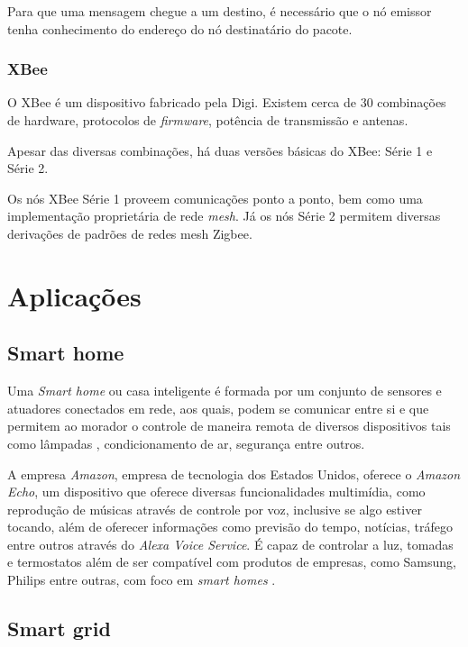 Para que uma mensagem chegue a um destino, é necessário que o nó emissor tenha conhecimento do 
endereço do nó destinatário do pacote.


\subsubsection{XBee}

O XBee é um dispositivo fabricado pela Digi. Existem cerca de 
30 combinações de hardware, protocolos de \textit{firmware}, potência de transmissão e antenas.

Apesar das diversas combinações, há duas versões básicas do XBee: Série 1 e Série 2.

Os nós XBee Série 1 proveem comunicações ponto a ponto, bem como uma implementação proprietária de 
rede \textit{mesh}. Já os nós Série 2 permitem diversas derivações de padrões de redes mesh Zigbee.

\section{Aplicações}

\subsection{Smart home}

Uma \textit{Smart home} ou casa inteligente é formada por um conjunto de sensores e atuadores 
conectados em rede, aos quais, podem se comunicar entre si e que permitem ao morador o controle de 
maneira remota de diversos dispositivos tais como lâmpadas \cite{mandula2015}, 
condicionamento de ar, segurança entre outros.

A empresa \textit{Amazon}, empresa de tecnologia dos Estados Unidos, oferece o \textit{Amazon 
Echo}, um dispositivo que oferece diversas funcionalidades multimídia, como reprodução de músicas 
através 
de controle por voz, inclusive se algo estiver tocando, além de oferecer informações como previsão 
do tempo, notícias, tráfego entre outros através do \textit{Alexa Voice Service}. É capaz de 
controlar a luz, tomadas e termostatos além de ser compatível com produtos de empresas, como 
Samsung, Philips entre outras, com foco em \textit{smart homes} \cite{amazon2017}.

\subsection{Smart grid}

